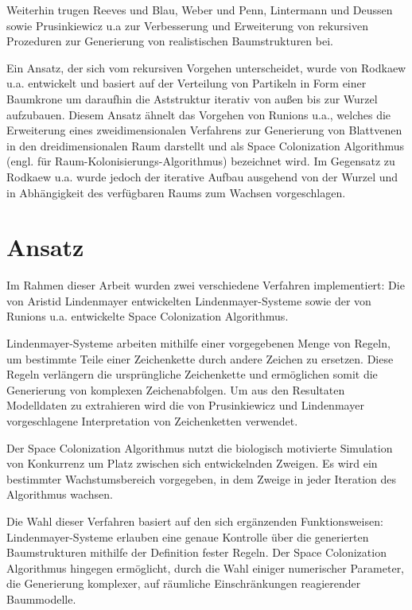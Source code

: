 Weiterhin trugen Reeves und Blau, Weber und Penn, Lintermann und Deussen sowie Prusinkiewicz u.a zur Verbesserung und Erweiterung von rekursiven Prozeduren zur Generierung von realistischen Baumstrukturen bei. \cite[S.1]{SpaceColonizationAlgorithm:07}

Ein Ansatz, der sich vom rekursiven Vorgehen unterscheidet, wurde von Rodkaew u.a. entwickelt und basiert auf der Verteilung von Partikeln in Form einer Baumkrone um daraufhin die Aststruktur iterativ von außen bis zur Wurzel aufzubauen. \cite[S.2]{SpaceColonizationAlgorithm:07} Diesem Ansatz ähnelt das Vorgehen von Runions u.a., welches die Erweiterung eines zweidimensionalen Verfahrens zur Generierung von Blattvenen in den dreidimensionalen Raum darstellt und als Space Colonization Algorithmus (engl. für Raum-Kolonisierungs-Algorithmus) bezeichnet wird. Im Gegensatz zu Rodkaew u.a. wurde jedoch der iterative Aufbau ausgehend von der Wurzel und in Abhängigkeit des verfügbaren Raums zum Wachsen vorgeschlagen. \cite[S.2]{SpaceColonizationAlgorithm:07}


\section{Ansatz}

Im Rahmen dieser Arbeit wurden zwei verschiedene Verfahren implementiert: Die von Aristid Lindenmayer entwickelten Lindenmayer-Systeme sowie der von Runions u.a. entwickelte Space Colonization Algorithmus. 

Lindenmayer-Systeme arbeiten mithilfe einer vorgegebenen Menge von Regeln, um bestimmte Teile einer Zeichenkette durch andere Zeichen zu ersetzen. Diese Regeln verlängern die ursprüngliche Zeichenkette und ermöglichen somit die Generierung von komplexen Zeichenabfolgen. \cite[S.2]{ABOP:04} Um aus den Resultaten Modelldaten zu extrahieren wird die von Prusinkiewicz und Lindenmayer vorgeschlagene Interpretation von Zeichenketten verwendet. \cite[S.6]{ABOP:04}

Der Space Colonization Algorithmus nutzt die biologisch motivierte Simulation von Konkurrenz um Platz zwischen sich entwickelnden Zweigen. Es wird ein bestimmter Wachstumsbereich vorgegeben, in dem Zweige in jeder Iteration des Algorithmus wachsen. \cite[S.5]{SpaceColonizationAlgorithm:07}

Die Wahl dieser Verfahren basiert auf den sich ergänzenden Funktionsweisen: Lindenmayer-Systeme erlauben eine genaue Kontrolle über die generierten Baumstrukturen mithilfe der Definition fester Regeln. Der Space Colonization Algorithmus hingegen ermöglicht, durch die Wahl einiger numerischer Parameter, die Generierung komplexer, auf räumliche Einschränkungen reagierender Baummodelle. \cite[S.5]{SpaceColonizationAlgorithm:07}

